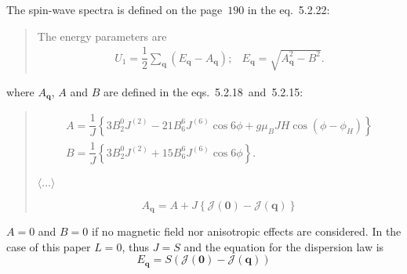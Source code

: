     The spin-wave spectra is defined on the page~$190$ in the eq.~5.2.22:
    \begin{quote}
        The energy parameters are
        \begin{equation}
            \begin{matrix}
                U_1 = \dfrac{1}{2}\sum_{\mathbf{q}}(E_{\mathbf{q}} - A_{\mathbf{q}}); & E_{\mathbf{q}} = \sqrt{A_{\mathbf{q}}^2 - B^2}.
            \end{matrix}
            \label{eq:rem-5.2.22} \tag{5.2.22}
        \end{equation}
    \end{quote}
    where $A_{\mathbf{q}}$, $A$ and $B$ are defined in the eqs.~5.2.18~and~5.2.15:
    \begin{quote}
        \begin{equation}
            \begin{matrix}
                A = \dfrac{1}{J}\left\{3B^0_2J^{(2)} - 21B^6_6J^{(6)}\cos6\phi + g\mu_BJH\cos(\phi - \phi_H)\right\}\\
                B = \dfrac{1}{J}\left\{3B^0_2J^{(2)} + 15B^6_6J^{(6)}\cos6\phi\right\}.
            \end{matrix}
            \label{eq:rem-5.2.15} \tag{5.2.15}
        \end{equation}

        $\langle ... \rangle$

        
        \begin{equation}
            A_{\mathbf{q}} = A + J\left\{\mathcal{J}(\mathbf{0}) - \mathcal{J}(\mathbf{q})\right\}
            \label{eq:rem-5.2.18} \tag{5.2.18}
        \end{equation}
    \end{quote}
    $A = 0$ and $B = 0$ if no magnetic field nor anisotropic effects are considered. In the case of this paper $L = 0$, thus $J = S$ and the equation for the dispersion law is
    \begin{equation}
        E_{\mathbf{q}} = S\left(\mathcal{J}(\mathbf{0}) - \mathcal{J}(\mathbf{q})\right)
    \end{equation}


